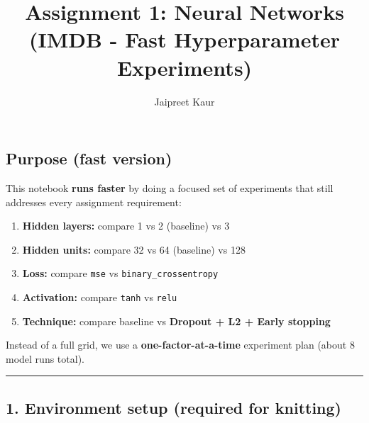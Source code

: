 \documentclass[
]{article}
\title{Assignment 1: Neural Networks (IMDB - Fast Hyperparameter
Experiments)}
\author{Jaipreet Kaur}
\date{}
\providecommand{\tightlist}{%
  \setlength{\itemsep}{0pt}\setlength{\parskip}{0pt}}
\begin{document}
\maketitle

{
\setcounter{tocdepth}{3}
\tableofcontents
}
\subsection{Purpose (fast version)}\label{purpose-fast-version}

This notebook \textbf{runs faster} by doing a focused set of experiments
that still addresses every assignment requirement:

\begin{enumerate}
\def\labelenumi{\arabic{enumi})}
\tightlist
\item
  \textbf{Hidden layers:} compare 1 vs 2 (baseline) vs 3\\
\item
  \textbf{Hidden units:} compare 32 vs 64 (baseline) vs 128\\
\item
  \textbf{Loss:} compare \texttt{mse} vs \texttt{binary\_crossentropy}\\
\item
  \textbf{Activation:} compare \texttt{tanh} vs \texttt{relu}\\
\item
  \textbf{Technique:} compare baseline vs \textbf{Dropout + L2 + Early
  stopping}
\end{enumerate}

Instead of a full grid, we use a \textbf{one-factor-at-a-time}
experiment plan (about 8 model runs total).

\begin{center}\rule{0.5\linewidth}{0.5pt}\end{center}

\subsection{1. Environment setup (required for
knitting)}\label{environment-setup-required-for-knitting}
\end{document}
